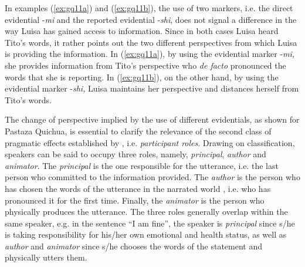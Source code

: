 \documentclass[output=paper]{langsci/langscibook}
\begin{document}
In examples (\ref{ex:gq11a}) and (\ref{ex:gq11b}), the use of two markers, i.e. the direct evidential -\textit{mi} and the reported evidential -\textit{shi}, does not signal a difference in the way Luisa has gained access to information. Since in both cases Luisa heard Tito’s words, it rather points out the two different perspectives from which Luisa is providing the information. In (\ref{ex:gq11a}), by using the evidential marker -\textit{mi,} she provides information from Tito’s perspective who \textit{de facto} pronounced the words that she is reporting. In (\ref{ex:gq11b}), on the other hand, by using the evidential marker -\textit{shi,} Luisa maintains her perspective and distances herself from Tito’s words.

The change of perspective implied by the use of different evidentials, as shown for Pastaza Quichua, is essential to clarify the relevance of the second class of pragmatic effects established by \citet{Hanks2012}, i.e. \textit{participant roles}. Drawing on  classification, speakers can be said to occupy three roles, namely, \textit{principal}, \textit{author} and \textit{animator}. The \textit{principal} is the one responsible for the utterance, i.e. the last person who committed to the information provided. The \textit{author} is the person who has chosen the words of the utterance in the narrated world \citep{Goffman1981}, i.e. who has pronounced it for the first time. Finally, the \textit{animator} is the person who physically produces the utterance. The three roles generally overlap within the same speaker, e.g. in the sentence “I am fine”, the speaker is \textit{principal} since s/he is taking responsibility for his/her own emotional and health status, as well as \textit{author} and \textit{animator} since s/he chooses the words of the statement and physically utters them. 
\end{document}
